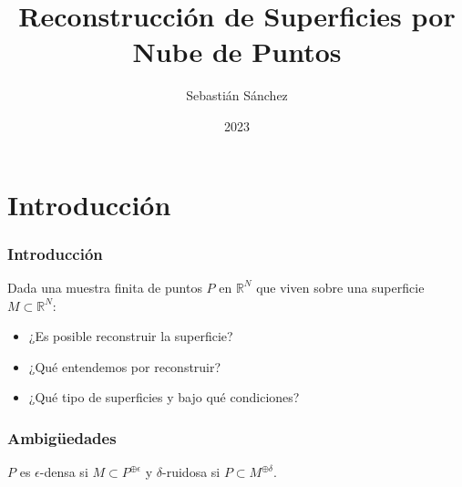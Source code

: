 \documentclass{beamer}
\title[Reconstrucción de Superficies]{Reconstrucción de Superficies por Nube de Puntos}
\author{Sebastián Sánchez}
\date{2023}
\newcommand{\R}{\mathbb{R}}
\begin{document}
\frame{\titlepage}

\section{Introducción}

\begin{frame}\frametitle{Introducción}
  Dada una muestra finita de puntos \(P\) en \(\R^N\) que viven sobre
  una superficie \(M\subset\R^N\):
  \begin{itemize}
    \item ¿Es posible reconstruir la superficie?
    \item ¿Qué entendemos por reconstruir?
    \item ¿Qué tipo de superficies y bajo qué condiciones?
  \end{itemize}
\end{frame}


\begin{frame}\frametitle{Ambigüedades}
  \usetikzlibrary[plotmarks]
  \begin{figure}[H]
  \begin{overprint}
  \centering
  \centering
  \end{overprint}
  \end{figure}

  \begin{Definicion}
    \(P\) es \(\epsilon\)-densa si \(M\subset P^{\oplus \epsilon}\)
    y \(\delta\)-ruidosa si \(P\subset M^{\oplus \delta}\).  
  \end{Definicion}
\end{frame}
\end{document}

